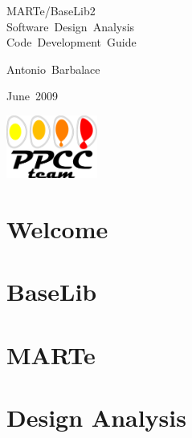 \documentclass[a4paper,11pt]{book}
\begin{document}
\begin{titlepage}
 \mbox{}
 \vspace{3.0cm}

 \begin{center}
  \mbox{\Huge{MARTe/BaseLib2}} \\
  \vspace{3.0cm}
  \mbox{\huge{Software Design Analysis}} \\
  \vspace{1.0cm}
  \mbox{\huge{Code Development Guide}} \\
 \end{center}

 \begin{center}
  \vspace{5.0cm}
  \mbox{Antonio Barbalace}
 \end{center}

 \begin{center}
  \vspace{0.5cm}
  \mbox{June 2009}
 \end{center}

 \begin{center}
  \vspace{0.5cm}
  \includegraphics[width=30mm]{PPCClogoBlack.eps}
 \end{center}

\end{titlepage}

\cleardoublepage

\tableofcontents

\listoffigures

\listoftables

\part{Welcome}


\part{BaseLib}








\part{MARTe}


%
%

\part{Design Analysis}


%
\end{document}
